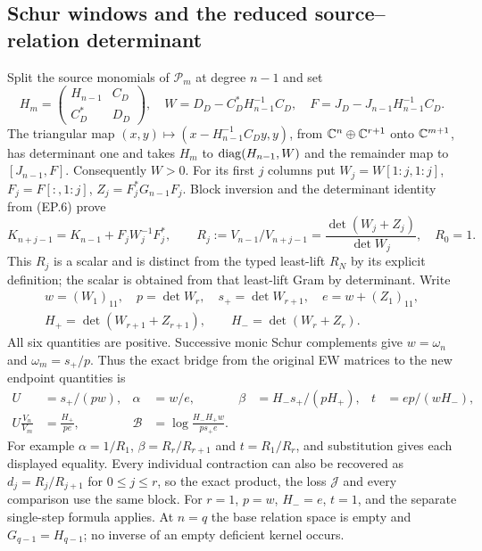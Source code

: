 \subsection{Schur windows and the reduced source--relation determinant}
Split the source monomials of $\mathcal P_m$ at degree $n-1$ and set
\[
 H_m=\begin{pmatrix}H_{n-1}&C_D\\C_D^*&D_D\end{pmatrix},\quad
 W=D_D-C_D^*H_{n-1}^{-1}C_D,\quad
 F=J_D-J_{n-1}H_{n-1}^{-1}C_D.\tag{EP.32}
\]
The triangular map $(x,y)\mapsto(x-H_{n-1}^{-1}C_Dy,y)$,
from $\mathbb C^n\oplus\mathbb C^{r+1}$ onto $\mathbb C^{m+1}$, has determinant one
and takes $H_m$ to $\operatorname{diag}(H_{n-1},W)$ and the remainder map to
$[J_{n-1},F]$. Consequently $W>0$. For its first $j$ columns put
$W_j=W[1:j,1:j]$, $F_j=F[:,1:j]$, $Z_j=F_j^*G_{n-1}F_j$.
Block inversion and the determinant identity from (EP.6) prove
\[
 K_{n+j-1}=K_{n-1}+F_jW_j^{-1}F_j^*,\qquad
 R_j:=V_{n-1}/V_{n+j-1}
 =\frac{\det(W_j+Z_j)}{\det W_j},\quad R_0=1.
\tag{EP.33}
\]
This $R_j$ is a scalar and is distinct from the typed least-lift
$R_N$ by its explicit definition; the scalar is obtained from that
least-lift Gram by determinant. Write
\[
 \begin{gathered}
 w=(W_1)_{11},\quad p=\det W_r,\quad s_+=\det W_{r+1},\quad
 e=w+(Z_1)_{11},\\
 H_+=\det(W_{r+1}+Z_{r+1}),\qquad H_- =\det(W_r+Z_r).
 \end{gathered}\tag{EP.34}
\]
All six quantities are positive. Successive monic Schur complements
give $w=\omega_n$ and $\omega_m=s_+/p$. Thus the exact bridge
from the original EW matrices to the new endpoint quantities is
\[
 \begin{aligned}
 U&=s_+/(pw),&\alpha&=w/e,&
 \beta&=H_-s_+/(pH_+),&t&=ep/(wH_-),\\
 U\frac{V_n}{V_m}&=\frac{H_+}{pe},&
 \mathcal B&=\log\frac{H_-H_+w}{ps_+e}.
 \end{aligned}\tag{EP.35}
\]
For example $\alpha=1/R_1$, $\beta=R_r/R_{r+1}$ and
$t=R_1/R_r$, and substitution gives each displayed equality.
Every individual contraction can also be recovered as
$d_j=R_j/R_{j+1}$ for $0\le j\le r$, so the exact product,
the loss $\mathcal J$ and every comparison use the same block.
For $r=1$, $p=w$, $H_-=e$, $t=1$, and the separate single-step
formula applies. At $n=q$ the base relation space is empty and
$G_{q-1}=H_{q-1}$; no inverse of an empty deficient kernel occurs.

